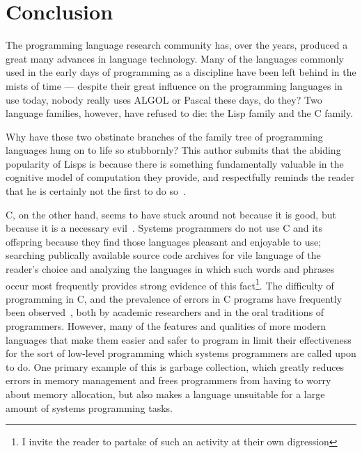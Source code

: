 \documentclass[11pt,draft]{article}
\theoremstyle{break}
\begin{document}
\vspace*{-.1in}
\section{Conclusion}
\label{sec:conclusion}
\vspace*{-.1in}

The programming language research community has, over the years, produced a great many advances in language technology. Many of the languages commonly used in the early days of programming as a discipline have been left behind in the mists of time --- despite their great influence on the programming languages in use today, nobody really uses ALGOL or Pascal these days, do they? Two language families, however, have refused to die: the Lisp family and the C family.

Why have these two obstinate branches of the family tree of programming languages hung on to life so stubbornly? This author submits that the abiding popularity of Lisps is because there is something fundamentally valuable in the cognitive model of computation they provide, and respectfully reminds the reader that he is certainly not the first to do so~\cite{sicp,raymond2003become}.

C, on the other hand, seems to have stuck around not because it is good, but because it is a necessary evil~\cite{Shapiro:2006:PLC:1215995.1216004}. Systems programmers do not use C and its offspring because they find those languages pleasant and enjoyable to use; searching publically available source code archives for vile language of the reader's choice and analyzing the languages in which such words and phrases occur most frequently provides strong evidence of this fact\footnote{I invite the reader to partake of such an activity at their own digression}. The difficulty of programming in C, and the prevalence of errors in C programs have frequently been observed~\cite{Shapiro:2006:PLC:1215995.1216004,Bhattacharya:2011:APL:1985793.1985817,Ray:2014:LSS:2635868.2635922}, both by academic researchers and in the oral traditions of programmers. However, many of the features and qualities of more modern languages that make them easier and safer to program in limit their effectiveness for the sort of low-level programming which systems programmers are called upon to do. One primary example of this is garbage collection, which greatly reduces errors in memory management and frees programmers from having to worry about memory allocation, but also makes a language unsuitable for a large amount of systems programming tasks.
\end{document}
